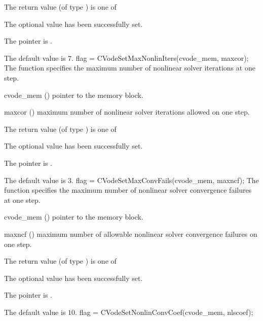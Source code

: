 {
  The return value  (of type ) is one of
  \begin{args}
  \item[\Id{SUCCESS}] 
    The optional value has been successfully set.
  \item[\Id{CVS\_NO\_MEM}]
    The  pointer is .
  \end{args}
}
{
  The default value is $7$.
}
{
flag = CVodeSetMaxNonlinIters(cvode\_mem, maxcor);
}
{
  The function  specifies the maximum
  number of nonlinear solver iterations at one step.
}
{
  \begin{args}
  \item[cvode\_mem] ()
    pointer to the {\cvode} memory block.
  \item[maxcor] ()
    maximum number of nonlinear solver iterations allowed on one step.
  \end{args}
}
{
  The return value  (of type ) is one of
  \begin{args}
  \item[\Id{SUCCESS}] 
    The optional value has been successfully set.
  \item[\Id{CVS\_NO\_MEM}]
    The  pointer is .
  \end{args}
}
{
  The default value is $3$.
}
{
flag = CVodeSetMaxConvFails(cvode\_mem, maxncf);
}
{
  The function  specifies the
  maximum number of nonlinear solver convergence failures at one step.
}
{
  \begin{args}
  \item[cvode\_mem] ()
    pointer to the {\cvode} memory block.
  \item[maxncf] ()
    maximum number of allowable nonlinear solver convergence failures
    on one step.
  \end{args}
}
{
  The return value  (of type ) is one of
  \begin{args}
  \item[\Id{SUCCESS}] 
    The optional value has been successfully set.
  \item[\Id{CVS\_NO\_MEM}]
    The  pointer is .
  \end{args}
}
{
  The default value is $10$.
}
{
flag = CVodeSetNonlinConvCoef(cvode\_mem, nlscoef);
}
